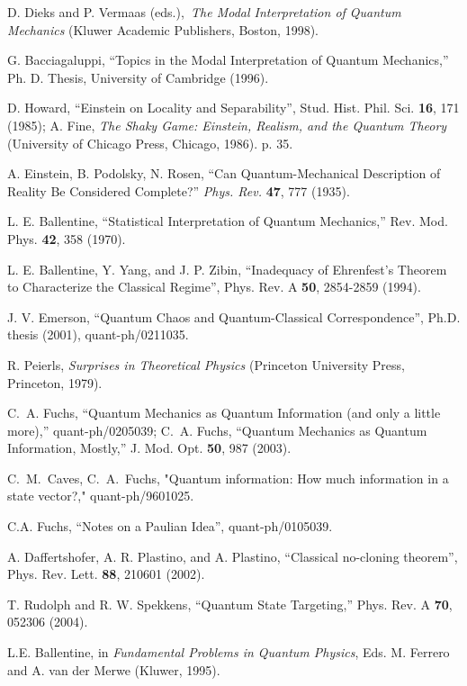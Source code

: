 \documentclass[pra,nofootinbib,showpacs,12pt]{revtex4}
\begin{document}
\begin{thebibliography}{99}
 D. Dieks and P. Vermaas (eds.),\textit{\ The Modal
Interpretation of Quantum Mechanics }(Kluwer Academic Publishers, Boston,
1998).

 G. Bacciagaluppi, ``Topics in the Modal
Interpretation of Quantum Mechanics,'' Ph. D. Thesis, University of
Cambridge (1996).

 D. Howard, ``Einstein on Locality and
Separability'', Stud. Hist. Phil. Sci. \textbf{16}, 171 (1985); A. Fine,
\textit{The Shaky Game: Einstein, Realism, and the Quantum Theory }%
(University of Chicago Press, Chicago, 1986). p. 35.

 A. Einstein, B. Podolsky, N. Rosen, ``Can Quantum-Mechanical
Description of Reality Be Considered Complete?'' \textit{Phys. Rev.} \textbf{%
47}, 777 (1935).

 L. E. Ballentine, ``Statistical Interpretation of
Quantum Mechanics,'' Rev. Mod. Phys. \textbf{42}, 358 (1970).

 L. E. Ballentine, Y. Yang, and J. P. Zibin,
``Inadequacy of Ehrenfest's Theorem to Characterize the Classical Regime'',
Phys. Rev. A \textbf{50}, 2854-2859 (1994).

 J. V. Emerson, ``Quantum Chaos and Quantum-Classical
Correspondence'', Ph.D. thesis (2001), quant-ph/0211035.

 R. Peierls, \textit{Surprises in Theoretical Physics}
(Princeton University Press, Princeton, 1979).

 C.~A. Fuchs, ``Quantum Mechanics as Quantum Information (and
only a little more),'' quant-ph/0205039; C.~A. Fuchs, ``Quantum Mechanics as
Quantum Information, Mostly,'' J. Mod. Opt. \textbf{50}, 987 (2003).

 C.~M.~Caves, C.~A.~Fuchs, "Quantum information: How
much information in a state vector?," quant-ph/9601025.

 C.A. Fuchs, ``Notes on a Paulian Idea'',
quant-ph/0105039.

 A. Daffertshofer, A. R. Plastino, and A.
Plastino, ``Classical no-cloning theorem'', Phys. Rev. Lett.
\textbf{88}, 210601 (2002).

 T. Rudolph and R. W. Spekkens, ``Quantum State
Targeting,'' Phys. Rev. A \textbf{70}, 052306 (2004).

 L.E. Ballentine, in \textit{Fundamental Problems
in Quantum Physics}, Eds. M. Ferrero and A. van der Merwe (Kluwer, 1995).


\end{thebibliography}
\end{document}
